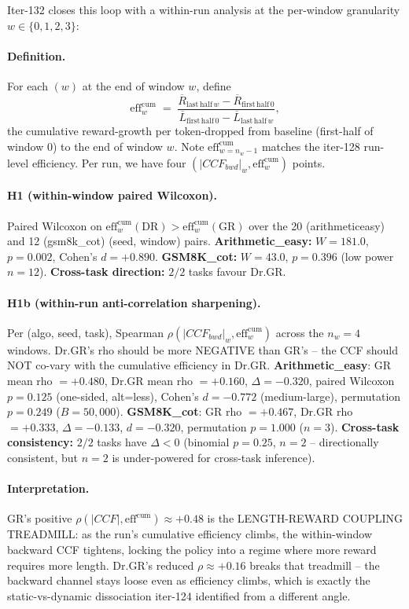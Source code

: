 \documentclass{article}
\begin{document}
Iter-132 closes this loop with a within-run analysis at the
per-window granularity $w\in\{0,1,2,3\}$:

\paragraph{Definition.}
For each $(w)$ at the end of window $w$, define
\[
  \mathrm{eff}^{\mathrm{cum}}_w \;=\;
    \frac{\overline R_{\mathrm{last\,half}\,w} - \overline R_{\mathrm{first\,half}\,0}}
         {\overline L_{\mathrm{first\,half}\,0} - \overline L_{\mathrm{last\,half}\,w}},
\]
the cumulative reward-growth per token-dropped from baseline
(first-half of window 0) to the end of window $w$.  Note
$\mathrm{eff}^{\mathrm{cum}}_{w=n_w-1}$ matches the iter-128
run-level efficiency.  Per run, we have four $(|CCF_{bwd}|_w,
\mathrm{eff}^{\mathrm{cum}}_w)$ points.

\paragraph{H1 (within-window paired Wilcoxon).}
Paired Wilcoxon on $\mathrm{eff}^{\mathrm{cum}}_w(\mathrm{DR}) >
\mathrm{eff}^{\mathrm{cum}}_w(\mathrm{GR})$ over the 20
(arithmeticeasy) and 12 (gsm8k\_cot) (seed, window) pairs.
\textbf{Arithmetic\_easy:} $W=181.0$, $p=0.002$, Cohen's $d=+0.890$.
\textbf{GSM8K\_cot:} $W=43.0$, $p=0.396$ (low power $n{=}12$).
\textbf{Cross-task direction:} $2/2$ tasks favour Dr.GR.

\paragraph{H1b (within-run anti-correlation sharpening).}
Per (algo, seed, task), Spearman
$\rho(|CCF_{bwd}|_w, \mathrm{eff}^{\mathrm{cum}}_w)$ across the
$n_w=4$ windows.  Dr.GR's rho should be more NEGATIVE than GR's --
the CCF should NOT co-vary with the cumulative efficiency in Dr.GR.
\textbf{Arithmetic\_easy}: GR mean rho $= +0.480$, Dr.GR mean rho $= +0.160$,
$\Delta = -0.320$, paired Wilcoxon $p=0.125$ (one-sided, alt=less),
Cohen's $d=-0.772$ (medium-large), permutation $p=0.249$ ($B=50{,}000$).
\textbf{GSM8K\_cot}: GR rho $= +0.467$, Dr.GR rho $= +0.333$,
$\Delta = -0.133$, $d=-0.320$, permutation $p=1.000$ ($n{=}3$).
\textbf{Cross-task consistency:} $2/2$ tasks have $\Delta < 0$
(binomial $p=0.25$, $n=2$ -- directionally consistent, but
$n=2$ is under-powered for cross-task inference).

\paragraph{Interpretation.}
GR's positive $\rho(|CCF|, \mathrm{eff}^{\mathrm{cum}})\approx +0.48$
is the LENGTH-REWARD COUPLING TREADMILL: as the run's cumulative
efficiency climbs, the within-window backward CCF tightens, locking
the policy into a regime where more reward requires more length.
Dr.GR's reduced $\rho\approx +0.16$ breaks that treadmill -- the
backward channel stays loose even as efficiency climbs, which is
exactly the static-vs-dynamic dissociation iter-124 identified from
a different angle.
\end{document}
